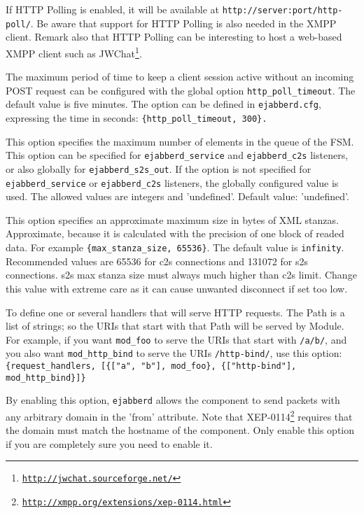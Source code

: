 \documentclass[a4paper,10pt]{book}
\newcommand{\ind}[1]{\begin{latexonly}\index{#1}\end{latexonly}}
\newcommand{\bracehack}{\def\{{\char"7B}\def\}{\char"7D}}
\newcommand{\titem}[1]{\item[\bracehack\texttt{#1}]}
\newcommand{\term}[1]{\texttt{#1}}
\newcommand{\ejabberd}{\texttt{ejabberd}}
\newcommand{\XMPP}{XMPP}
\gdef\footahref#1#2{#2\footnote{\href{#1}{\texttt{#1}}}}
\newcommand{\txepref}[2]{\footahref{http://xmpp.org/extensions/xep-#1.html}{#2}}
\newcommand{\xepref}[1]{\txepref{#1}{XEP-#1}}
\begin{document}
\begin{description}
    If HTTP Polling is enabled, it will be available at
    \verb|http://server:port/http-poll/|. Be aware that support for HTTP Polling
    is also needed in the \XMPP{} client. Remark also that HTTP Polling can be
    interesting to host a web-based \XMPP{} client such as
    \footahref{http://jwchat.sourceforge.net/}{JWChat}.

    The maximum period of time to keep a client session active without
    an incoming POST request can be configured with the global option
    \term{http\_poll\_timeout}. The default value is five minutes.
    The option can be defined in \term{ejabberd.cfg}, expressing the time
    in seconds: \verb|{http_poll_timeout, 300}.|
  \titem{\{max\_fsm\_queue, Size\}}
    This option specifies the maximum number of elements in the queue of the FSM.
    This option can be specified for \term{ejabberd\_service} and
    \term{ejabberd\_c2s} listeners,
    or also globally for \term{ejabberd\_s2s\_out}.
    If the option is not specified for \term{ejabberd\_service} or
    \term{ejabberd\_c2s} listeners,
    the globally configured value is used.
    The allowed values are integers and 'undefined'.
    Default value: 'undefined'.
  \titem{\{max\_stanza\_size, Size\}}
    \ind{options!max\_stanza\_size}This option specifies an
    approximate maximum size in bytes of XML stanzas.  Approximate,
    because it is calculated with the precision of one block of readed
    data. For example \verb|{max_stanza_size, 65536}|.  The default
    value is \term{infinity}. Recommended values are 65536 for c2s
    connections and 131072 for s2s connections. s2s max stanza size
    must always much higher than c2s limit. Change this value with
    extreme care as it can cause unwanted disconnect if set too low.
  \titem{\{request\_handlers, [ \{Path, Module\}, ...]\}} To define one or several handlers that will serve HTTP requests.
    The Path is a list of strings; so the URIs that start with that Path will be served by Module.
    For example, if you want \term{mod\_foo} to serve the URIs that start with \term{/a/b/},
    and you also want \term{mod\_http\_bind} to serve the URIs \term{/http-bind/},
    use this option: \term{\{request\_handlers, [\{["a", "b"], mod\_foo\}, \{["http-bind"], mod\_http\_bind\}]\}}
  \titem{\{service\_check\_from, true|false\}}
    By enabling this option, \ejabberd{} allows the component to send packets with any arbitrary domain in the 'from' attribute.
    Note that \xepref{0114} requires that the domain must match the hostname of the component.
    Only enable this option if you are completely sure you need to enable it.

\end{description}
\end{document}
